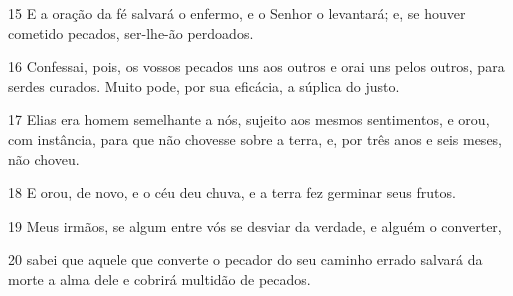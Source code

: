 \par 15 E a oração da fé salvará o enfermo, e o Senhor o levantará; e, se houver cometido pecados, ser-lhe-ão perdoados.
\par 16 Confessai, pois, os vossos pecados uns aos outros e orai uns pelos outros, para serdes curados. Muito pode, por sua eficácia, a súplica do justo.
\par 17 Elias era homem semelhante a nós, sujeito aos mesmos sentimentos, e orou, com instância, para que não chovesse sobre a terra, e, por três anos e seis meses, não choveu.
\par 18 E orou, de novo, e o céu deu chuva, e a terra fez germinar seus frutos.
\par 19 Meus irmãos, se algum entre vós se desviar da verdade, e alguém o converter,
\par 20 sabei que aquele que converte o pecador do seu caminho errado salvará da morte a alma dele e cobrirá multidão de pecados.


